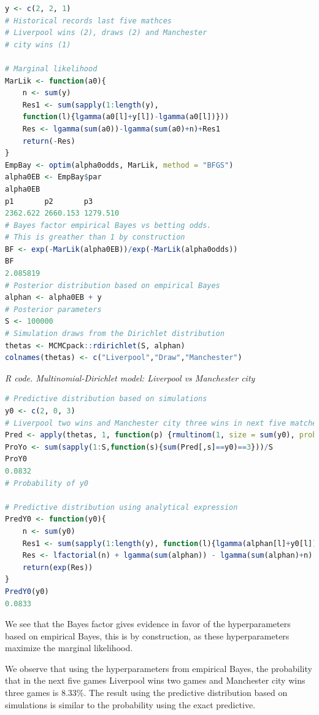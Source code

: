 \begin{enumerate}
\begin{tcolorbox}[enhanced,width=4.67in,center upper,
	fontupper=\large\bfseries,drop shadow southwest,sharp corners]
\begin{VF}
\begin{lstlisting}[language=R]
y <- c(2, 2, 1) 
# Historical records last five mathces
# Liverpool wins (2), draws (2) and Manchester
# city wins (1)

# Marginal likelihood
MarLik <- function(a0){
	n <- sum(y)
	Res1 <- sum(sapply(1:length(y), 
	function(l){lgamma(a0[l]+y[l])-lgamma(a0[l])}))
	Res <- lgamma(sum(a0))-lgamma(sum(a0)+n)+Res1
	return(-Res)
}
EmpBay <- optim(alpha0odds, MarLik, method = "BFGS")
alpha0EB <- EmpBay$par
alpha0EB
p1       p2       p3 
2362.622 2660.153 1279.510 
# Bayes factor empirical Bayes vs betting odds. 
# This is greather than 1 by construction
BF <- exp(-MarLik(alpha0EB))/exp(-MarLik(alpha0odds))
BF
2.085819
# Posterior distribution based on empirical Bayes
alphan <- alpha0EB + y 
# Posterior parameters 
S <- 100000
# Simulation draws from the Dirichlet distribution 
thetas <- MCMCpack::rdirichlet(S, alphan)
colnames(thetas) <- c("Liverpool","Draw","Manchester")
\end{lstlisting}
\end{VF}
\end{tcolorbox}


\begin{tcolorbox}[enhanced,width=4.67in,center upper,
	fontupper=\large\bfseries,drop shadow southwest,sharp corners]
	\textit{R code. Multinomial-Dirichlet model: Liverpool vs Manchester city}
\begin{VF}
\begin{lstlisting}[language=R]
# Predictive distribution based on simulations
y0 <- c(2, 0, 3) 
# Liverpool two wins and Manchester city three wins in next five matches
Pred <- apply(thetas, 1, function(p) {rmultinom(1, size = sum(y0), prob = p)})
ProYo <- sum(sapply(1:S,function(s){sum(Pred[,s]==y0)==3}))/S
ProY0
0.0832
# Probability of y0

# Predictive distribution using analytical expression
PredY0 <- function(y0){
	n <- sum(y0)
	Res1 <- sum(sapply(1:length(y), function(l){lgamma(alphan[l]+y0[l]) - lgamma(alphan[l])-lfactorial(y0[l])}))
	Res <- lfactorial(n) + lgamma(sum(alphan)) - lgamma(sum(alphan)+n) + Res1
	return(exp(Res))
}
PredY0(y0)         
0.0833
\end{lstlisting}
\end{VF}
\end{tcolorbox}

We see that the Bayes factor gives evidence in favor of the hyperparameters based on empirical Bayes, this is by construction, as these hyperparameters maximize the marginal likelihood.

We observe that using the hyperparameters from empirical Bayes, the probability that in the next five games Liverpool wins two games and Manchester city wins three games is 8.33\%. The result using the predictive distribution based on simulations is similar to the probability using the exact predictive.


\end{enumerate}
